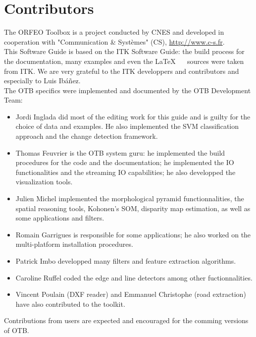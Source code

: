 \chapter*{Contributors}
\noindent

The ORFEO Toolbox is a project conducted by CNES and developed in
cooperation with "Communication \&
  Syst\`{e}mes" (CS), \url{http://www.c-s.fr}.\\

This Software Guide is based on the ITK Software Guide: the build
process for the documentation, many examples and even the \LaTeX~ ~
sources were taken from ITK. We are very grateful to the ITK
developpers and contributors and especially to Luis Ib\'a\~nez.\\

The OTB specifics were implemented and documented by the OTB Development Team:
\begin{itemize}
  \item Jordi Inglada did most of the editing work for this guide and
  is guilty for the choice of data and examples. He also implemented
  the SVM classification approach and the change detection framework.
  \item Thomas Feuvrier is the OTB system guru: he implemented the
  build procedures for the code and the documentation; he implemented
  the IO functionalities and the streaming IO capabilities; he also
  developped the visualization tools.
  \item Julien Michel implemented the morphological pyramid
  functionnalities, the spatial reasoning tools, Kohonen's SOM,
  disparity map estimation, as
  well as some applications and filters.
\item Romain Garrigues is responsible for some applications; he also
  worked on the multi-platform installation procedures.
  \item Patrick Imbo developped many filters and feature
  extraction algorithms.
  \item Caroline Ruffel coded the edge and line detectors among other
  fuctionnalities.
\item Vincent Poulain (DXF reader) and Emmanuel Christophe (road
  extraction) have also contributed to the toolkit.

\end{itemize}

Contributions from users are expected and encouraged for the comming
versions of OTB.

